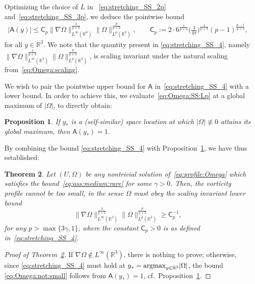 \documentclass[11pt,reqno]{amsproc}
\numberwithin{equation}{section}
\newtheorem{theorem}{Theorem}[section]
\newtheorem{proposition}[theorem]{Proposition}
\theoremstyle{remark}
\begin{document}
Optimizing the choice of $L$ in ~\eqref{eq:stretching_SS_2p} and~\eqref{eq:stretching_SS_3p}, we deduce the pointwise bound 
\begin{align}
|\mathsf{A}(y)| \leq  \mathsf{C}_p \|\nabla \Omega\|_{L^\infty(\mathbb{R}^3)}^{\frac{3}{p+3}} \|\Omega\|_{L^p(\mathbb{R}^3)}^{\frac{p}{p+3}}
,
\qquad
\mathsf{C}_p:= 2 \cdot 6^{\frac{3}{p+3}} \bigl( \tfrac{3 }{4\pi}\bigr)^{\frac{1}{p+3}}  
(p-1)^{\frac{p-1}{p+3}}
,
\label{eq:stretching_SS_4} 
\end{align}
for all $y\in \mathbb{R}^3$.
We note that the quantity present in \eqref{eq:stretching_SS_4}, namely
$\|\nabla \Omega\|_{L^\infty(\mathbb{R}^3)}^{\frac{3}{p+3}} \|\Omega\|_{L^p(\mathbb{R}^3)}^{\frac{p}{p+3}}$,  is scaling invariant under the natural scaling from~\eqref{eq:Omega:scaling}.

We wish to pair the pointwise upper bound for $\mathsf{A}$ in~\eqref{eq:stretching_SS_4} with a lower bound. In order to achieve this, we evaluate~\eqref{eq:Omega:SS:Lp} at a global maximum of $|\Omega|$, to directly obtain:
\begin{proposition}
\label{prop:A=1}
If $y_{*}$ is a (self-similar) space location at which  $|\Omega|\not \equiv 0$ attains its global maximum, then  $\mathsf{A}(y_{*}) = 1$. 
\end{proposition}

By combining the bound \eqref{eq:stretching_SS_4} with Proposition~\ref{prop:A=1}, we have thus established:
\begin{theorem}
\label{thm:Omega:not:small}
Let $(U,\Omega)$ be any nontrivial solution of~\eqref{eq:profile:Omega} which satisfies the bound~\eqref{eq:ass:medium:rare} for some $\gamma >0$.
Then, the vorticity profile cannot be too small, in the sense $\Omega$ must obey the scaling invariant lower bound
\begin{equation}
\|\nabla \Omega\|_{L^\infty(\mathbb{R}^3)}^{\frac{3}{p+3}} \|\Omega\|_{L^p(\mathbb{R}^3)}^{\frac{p}{p+3}}
\geq 
 \mathsf{C}_p^{-1}, 
\label{eq:Omega:not:small}
\end{equation}
for any $p > \max\{3 \gamma,1\}$, where the constant $\mathsf{C}_p>0$ is as defined in~\eqref{eq:stretching_SS_4}.
\end{theorem}
\begin{proof}[Proof of Theorem~\ref{thm:Omega:not:small}]
If $\nabla \Omega \not\in L^\infty(\mathbb{R}^3)$, there is nothing to prove; otherwise, since \eqref{eq:stretching_SS_4} must hold at ${y_{*}} = {\rm argmax}_{y\in \mathbb{R}^3} |\Omega|$, the bound \eqref{eq:Omega:not:small} follows from $\mathsf{A}({y_{*}}) = 1$, cf.~{Proposition}~\ref{prop:A=1}.
\end{proof}
\end{document}
